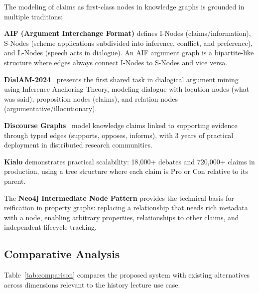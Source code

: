 The modeling of claims as first-class nodes in knowledge graphs is grounded in multiple traditions:

\textbf{AIF (Argument Interchange Format)} defines I-Nodes (claims/information), S-Nodes (scheme applications subdivided into inference, conflict, and preference), and L-Nodes (speech acts in dialogue). An AIF argument graph is a bipartite-like structure where edges always connect I-Nodes to S-Nodes and vice versa.

\textbf{DialAM-2024}~\cite{ruizdolz2024dialam} presents the first shared task in dialogical argument mining using Inference Anchoring Theory, modeling dialogue with locution nodes (what was said), proposition nodes (claims), and relation nodes (argumentative/illocutionary).

\textbf{Discourse Graphs}~\cite{chan2024discourse} model knowledge claims linked to supporting evidence through typed edges (supports, opposes, informs), with 3 years of practical deployment in distributed research communities.

\textbf{Kialo} demonstrates practical scalability: 18,000+ debates and 720,000+ claims in production, using a tree structure where each claim is Pro or Con relative to its parent.

The \textbf{Neo4j Intermediate Node Pattern} provides the technical basis for reification in property graphs: replacing a relationship that needs rich metadata with a node, enabling arbitrary properties, relationships to other claims, and independent lifecycle tracking.

\subsection{Comparative Analysis}

Table~\ref{tab:comparison} compares the proposed system with existing alternatives across dimensions relevant to the history lecture use case.

